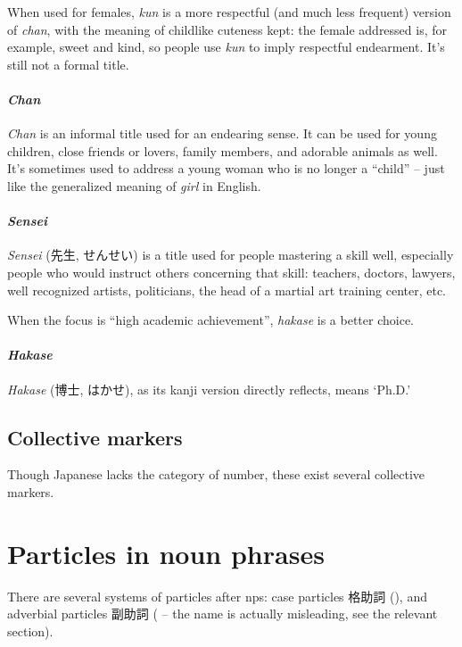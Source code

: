 \documentclass[UTF8, a4paper, oneside, scheme=plain]{ctexrep}
\newcommand{\corpus}[1]{\emph{#1}}
\newcommand{\translate}[1]{`#1'}
\begin{document}
When used for females, \corpus{kun} is a more respectful (and much less frequent) version of \corpus{chan},
with the meaning of childlike cuteness kept:
the female addressed is, for example, sweet and kind,
so people use \corpus{kun} to imply respectful endearment.
It's still not a formal title.

\subsubsection{\corpus{Chan}}

\corpus{Chan} is an informal title used for an endearing sense.
It can be used for young children, close friends or lovers, family members, and adorable animals as well.
It's sometimes used to address a young woman who is no longer a ``child'' 
-- just like the generalized meaning of \corpus{girl} in English.

\subsubsection{\corpus{Sensei}}

\corpus{Sensei} (先生, せんせい) is a title used for people mastering a skill well, 
especially people who would instruct others concerning that skill:
teachers, doctors, lawyers, well recognized artists, politicians,
the head of a martial art training center, etc.

When the focus is ``high academic achievement'', \corpus{hakase} is a better choice.

\subsubsection{\corpus{Hakase}}

\corpus{Hakase} (博士, はかせ), as its kanji version directly reflects, means \translate{Ph.D.}

\section{Collective markers}

Though Japanese lacks the category of number,
these exist several collective markers.

\chapter{Particles in noun phrases}\label{chap:particle-in-np}

There are several systems of particles after \ac{np}s:
case particles 格助詞 (),
and adverbial particles 副助詞 ( 
-- the name is actually misleading, see the relevant section).
\end{document}
